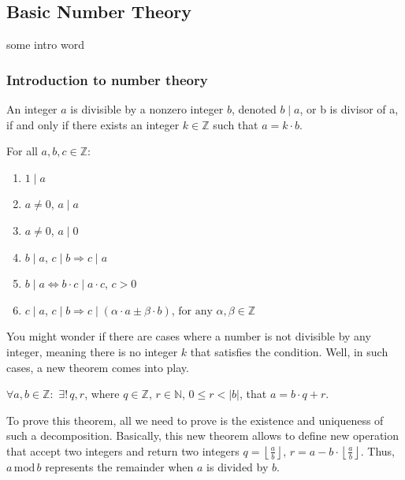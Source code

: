 \documentclass[../lecture-notes.tex]{subfiles}
\begin{document}
\subsection{Basic Number Theory}

some intro word

\subsubsection{Introduction to number theory}

\begin{definition}
    An integer $a$ is divisible by a nonzero integer $b$, denoted $b \mid a$, or b is divisor of a, if and only if there exists an integer $k \in \mathbb{Z}$ such that $a = k \cdot b$.
\end{definition}

\begin{lemma}
    For all $a, b, c \in \mathbb{Z}:$
    \hfill
    \begin{enumerate}
        \item $1 \mid a$
        \item $a \neq 0$, $a \mid a$
        \item $a \neq 0$, $a \mid 0$
        \item $b \mid a$, $c \mid b \Rightarrow c \mid a$
        \item $b \mid a \iff b \cdot c \mid a \cdot c$, $c > 0$
        \item $c \mid a$, $c \mid b  \Rightarrow c \mid (\alpha \cdot a \pm \beta \cdot b)$, $\text{for any } \alpha, \beta \in \mathbb{Z}$
    \end{enumerate}
\end{lemma}

You might wonder if there are cases where a number is not divisible by any integer, meaning there is no integer $k$ that satisfies the condition. Well, in such cases, a new theorem comes into play.

\begin{theorem}
    $\forall a, b \in \mathbb{Z}:$ $\exists!\, q, r$, where $q \in \mathbb{Z}$, $r \in \mathbb{N}$, $0 \leq r < |b|$, that $a = b \cdot q + r$.
\end{theorem}

To prove this theorem, all we need to prove is the existence and uniqueness of such a decomposition. Basically, this new theorem allows to define new operation that accept two integers and return two integers $q = \left\lfloor \frac{a}{b} \right\rfloor$, $r = a - b \cdot \left\lfloor \frac{a}{b} \right\rfloor$. Thus, $a \, \text{mod} \, b$ represents the remainder when $a$ is divided by $b$.
\end{document}
